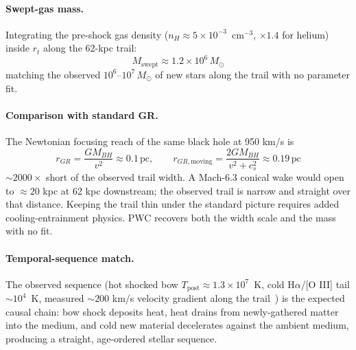 \documentclass[aps,prd,twocolumn,superscriptaddress,amsmath,amssymb,nofootinbib,floatfix]{revtex4-2}
\newcommand{\Msun}{M_{\odot}}
\begin{document}
\paragraph*{Swept-gas mass.}
Integrating the pre-shock gas density ($n_H \approx 5 \times 10^{-3}$~cm$^{-3}$, $\times 1.4$ for helium) inside $r_t$ along the 62-kpc trail:
\begin{equation}
M_{\text{swept}} \approx 1.2 \times 10^{6}\,\Msun
\end{equation}
matching the observed $10^{6}$--$10^{7}\,\Msun$ of new stars along the trail with no parameter fit.

\paragraph*{Comparison with standard GR.}
The Newtonian focusing reach of the same black hole at 950 km/s is
\begin{equation}
r_{GR} = \frac{G M_{BH}}{v^2} \approx 0.1\,\text{pc}, \qquad r_{GR,\text{moving}} = \frac{2 G M_{BH}}{v^2 + c_s^2} \approx 0.19\,\text{pc}
\end{equation}
$\sim 2000\times$ short of the observed trail width. A Mach-6.3 conical wake would open to $\approx 20$ kpc at 62 kpc downstream; the observed trail is narrow and straight over that distance. Keeping the trail thin under the standard picture requires added cooling-entrainment physics. PWC recovers both the width scale and the mass with no fit.

\paragraph*{Temporal-sequence match.}
The observed sequence (hot shocked bow $T_{\text{post}} \approx 1.3 \times 10^{7}$~K, cold H$\alpha$/[O III] tail $\sim 10^{4}$~K, measured $\sim 200$ km/s velocity gradient along the trail~\cite{KaulOh2026}) is the expected causal chain: bow shock deposits heat, heat drains from newly-gathered matter into the medium, and cold new material decelerates against the ambient medium, producing a straight, age-ordered stellar sequence.
\end{document}
